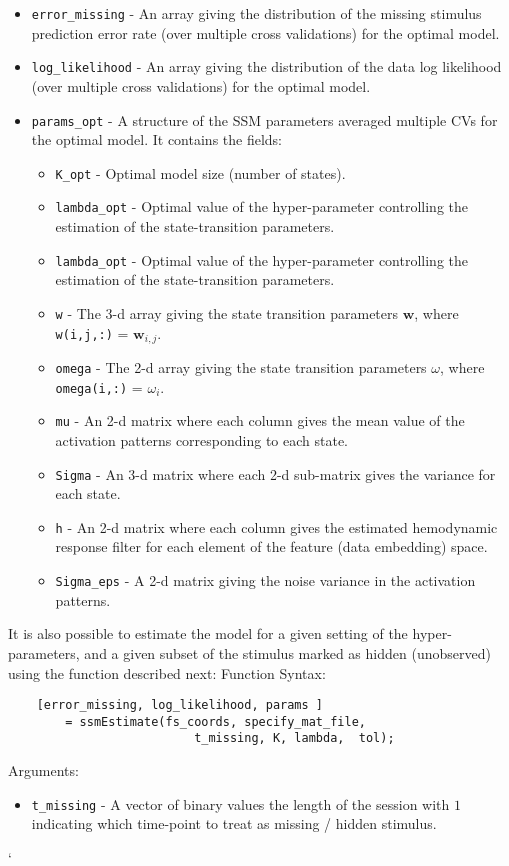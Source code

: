 \begin{itemize}
    \item \verb"error_missing" - An array giving the distribution of the missing stimulus prediction
    error rate (over multiple cross validations) for the optimal model.
    \item \verb"log_likelihood" - An array giving the distribution of the data log
    likelihood (over multiple cross validations) for the optimal model.
    \item \verb"params_opt" - A structure of the SSM parameters averaged multiple CVs for the optimal model.
    It contains the fields:
    \begin{itemize}
      \item \verb"K_opt" - Optimal model size (number of states).
      \item \verb"lambda_opt" - Optimal value of the hyper-parameter controlling the
      estimation of the state-transition    parameters.
      \item \verb"lambda_opt" - Optimal value of the hyper-parameter controlling the
      estimation of the state-transition    parameters.
      \item \verb"w" - The 3-d array giving the state transition parameters $\mathbf{w}$,
      where \verb"w(i,j,:)" = $\mathbf{w}_{i,j}$.
      \item \verb"omega" - The 2-d array giving the state transition parameters $\omega$,
      where \verb"omega(i,:)" = $\omega_{i}$.
      \item \verb"mu" - An 2-d matrix where each column gives the mean value of the activation
      patterns corresponding to each state.
      \item \verb"Sigma" - An 3-d matrix where each 2-d sub-matrix gives the variance for each state.
      \item \verb"h" - An 2-d matrix where each column gives the estimated hemodynamic response filter
      for each element of the feature (data embedding) space.
      \item \verb"Sigma_eps" - A 2-d matrix giving the noise variance in the activation patterns.
    \end{itemize}
\end{itemize}

It is also possible to estimate the model for a given setting of the
hyper-parameters, and a given subset of the stimulus marked as hidden (unobserved) using the function described
next:
Function Syntax:
\begin{verbatim}
    [error_missing, log_likelihood, params ]
        = ssmEstimate(fs_coords, specify_mat_file,
                          t_missing, K, lambda,  tol);
\end{verbatim}
Arguments:
\begin{itemize}
  \item \verb"t_missing" - A vector of binary values the length of the session with $1$ indicating which time-point to treat
  as missing / hidden stimulus.
\end{itemize}`
